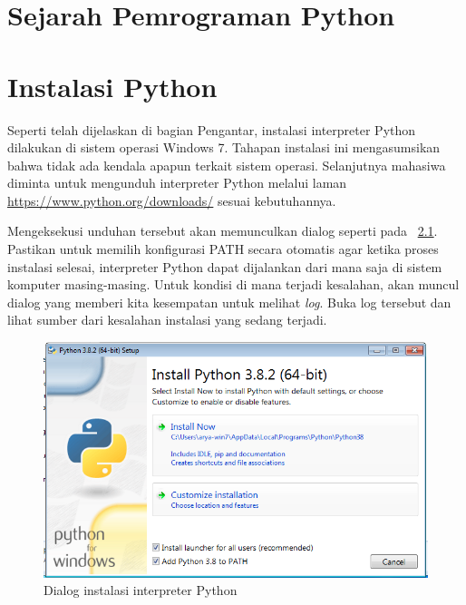 




\pagestyle{empty} %

\titleGM %
\setcounter{page}{0}
\tableofcontents
\listoffigures
{}
\lstlistoflistings
\addChapter{\kataPengantar}


\chapter{Sejarah Pemrograman Python}

\chapter{Instalasi Python}
Seperti telah dijelaskan di bagian Pengantar, instalasi interpreter Python dilakukan di sistem operasi Windows 7. Tahapan instalasi ini mengasumsikan bahwa tidak ada kendala apapun terkait sistem operasi. Selanjutnya mahasiwa diminta untuk mengunduh interpreter Python melalui laman \url{https://www.python.org/downloads/} sesuai kebutuhannya. 

Mengeksekusi unduhan tersebut akan memunculkan dialog seperti pada \figurename~\ref{fig:install1}. Pastikan untuk memilih konfigurasi PATH secara otomatis agar ketika proses instalasi selesai, interpreter Python dapat dijalankan dari mana saja di sistem komputer masing-masing. Untuk kondisi di mana terjadi kesalahan, akan muncul dialog yang memberi kita kesempatan untuk melihat \textit{log}. Buka log tersebut dan lihat sumber dari kesalahan instalasi yang sedang terjadi.

\begin{figure}[h!]
   \begin{center}
     \includegraphics[scale=.5]{pics/installPython1.png}
     \caption{Dialog instalasi interpreter Python}
     \label{fig:install1}
   \end{center}
 \end{figure} 

